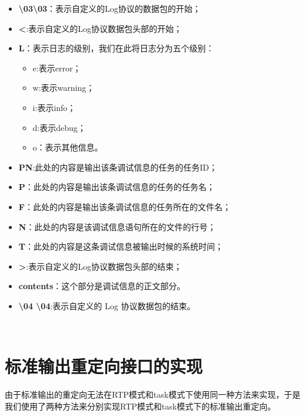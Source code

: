 \begin{itemize}
\item \textbf{\backslash 03\backslash 03}：表示自定义的Log协议的数据包的开始；

\item \textbf{<}:表示自定义的Log协议数据包头部的开始；

\item \textbf{L}：表示日志的级别，我们在此将日志分为五个级别：
	\begin{itemize}
	\item e:表示error；
	
	\item w:表示warning；
	
	\item i:表示info；
	
	\item d:表示debug；
	
	\item o：表示其他信息。
	\end{itemize}
	
\item \textbf{PN}:此处的内容是输出该条调试信息的任务的任务ID；

\item \textbf{P}：此处的内容是输出该条调试信息的任务的任务名；

\item \textbf{F}：此处的内容是输出该条调试信息的任务所在的文件名；

\item \textbf{N}：此处的内容是该调试信息语句所在的文件的行号；

\item \textbf{T}：此处的内容是这条调试信息被输出时候的系统时间；

\item \textbf{>}:表示自定义的Log协议数据包头部的结束；

\item \textbf{contents}：这个部分是调试信息的正文部分。

\item \textbf{\backslash 04 \backslash 04}:表示自定义的 Log 协议数据包的结束。

\end{itemize}\\


\section{标准输出重定向接口的实现}
	由于标准输出的重定向无法在RTP模式和task模式下使用同一种方法来实现，于是我们使用了两种方法来分别实现RTP模式和task模式下的标准输出重定向。
